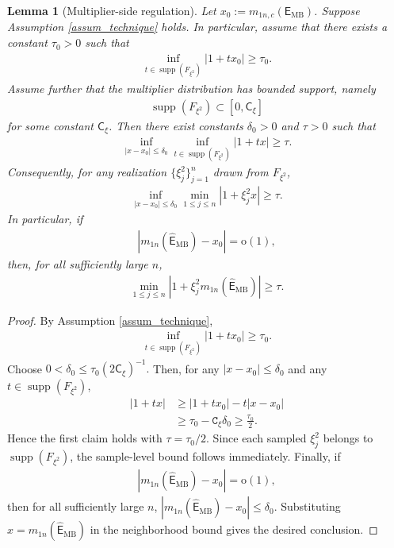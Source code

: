 \documentclass[12pt]{article}
\theoremstyle{plain}
\newtheorem{lemma}{Lemma}[section]
\numberwithin{equation}{section}
\begin{document}
\begin{lemma}[Multiplier-side regulation]\label{lem_regulation}
	Let $x_0:=m_{1n,c}(\mathsf{E}_{\mathrm{MB}})$. Suppose Assumption \ref{assum_technique} holds. In particular, assume that there exists a constant $\tau_0>0$ such that
	\begin{align*}
		\inf_{t\in \operatorname{supp}(F_{\xi^2})}
		|1+t x_0|\geq \tau_0 .
	\end{align*}
	Assume further that the multiplier distribution has bounded support, namely
	\begin{align*}
		\operatorname{supp}(F_{\xi^2})\subset [0,\mathsf{C}_\xi]
	\end{align*}
	for some constant $\mathsf{C}_\xi$. Then there exist constants $\delta_0>0$ and $\tau>0$ such that
	\begin{align*}
		\inf_{|x-x_0|\leq \delta_0}
		\inf_{t\in \operatorname{supp}(F_{\xi^2})}
		|1+tx|\geq \tau .
	\end{align*}
	Consequently, for any realization $\{\xi_j^2\}_{j=1}^n$ drawn from
	$F_{\xi^2}$,
	\begin{align*}
		\inf_{|x-x_0|\le \delta_0} \min_{1\leq j\leq n} |1+\xi_j^2x|\geq \tau.
	\end{align*}
	In particular, if
	\begin{align*}
		|m_{1n}(\widehat{\mathsf{E}}_{\mathrm{MB}})-x_0|=\mathrm{o}(1),
	\end{align*}
	then, for all sufficiently large $n$,
	\begin{align*}
		\min_{1\le j\le n}|1+\xi_j^2m_{1n}(\widehat{\mathsf{E}}_{\mathrm{MB}})|\geq \tau .
	\end{align*}
\end{lemma}
\begin{proof}
	By Assumption \ref{assum_technique},
	\begin{align*}
		\inf_{t\in \operatorname{supp}(F_{\xi^2})}|1+t x_0|\geq \tau_0.
	\end{align*}
	Choose $0<\delta_0\leq \tau_0(2\mathsf{C}_\xi)^{-1}.$ Then, for any $|x-x_0|\le \delta_0$ and any $t\in \operatorname{supp}(F_{\xi^2})$,
	\begin{align*}
		|1+tx|&\ge |1+t x_0|-t|x-x_0|  \\
		&\ge \tau_0-\mathtt{C}_\xi\delta_0\ge \frac{\tau_0}{2}.
	\end{align*}
	Hence the first claim holds with $\tau=\tau_0/2$. Since each sampled $\xi_j^2$ belongs to $\operatorname{supp}(F_{\xi^2})$, the sample-level bound follows immediately. Finally, if
	\begin{align*}
		|m_{1n}(\widehat{\mathsf{E}}_{\mathrm{MB}})-x_0|=\mathrm{o}(1),
	\end{align*}
	then for all sufficiently large $n$,
	$|m_{1n}(\widehat{\mathsf{E}}_{\mathrm{MB}})-x_0|\le \delta_0.$ Substituting $x=m_{1n}(\widehat{\mathsf{E}}_{\mathrm{MB}})$ in the neighborhood bound gives the desired conclusion.
\end{proof}
\end{document}
